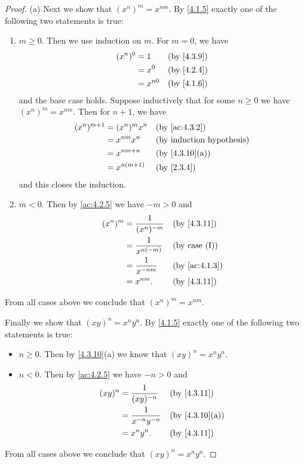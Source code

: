 \begin{proof}{(a)}
	Next we show that \((x^n)^m = x^{nm}\).
	By \cref{4.1.5} exactly one of the following two statements is true:
	\begin{enumerate}[label=(\Roman*)]
		\item \(m \geq 0\).
		      Then we use induction on \(m\).
		      For \(m = 0\), we have
		      \begin{align*}
			      (x^n)^0 & = 1      &  & \by{4.3.9} \\
			              & = x^0    &  & \by{4.2.4} \\
			              & = x^{n0} &  & \by{4.1.6}
		      \end{align*}
		      and the base case holds.
		      Suppose inductively that for some \(n \geq 0\) we have \((x^n)^m = x^{nm}\).
		      Then for \(n + 1\), we have
		      \begin{align*}
			      (x^n)^{m + 1} & = (x^n)^m x^n  &  & \by{ac:4.3.2}                \\
			                    & = x^{nm} x^n   &  & \byIH                        \\
			                    & = x^{nm + n}   &  & \text{(by \cref{4.3.10}(a))} \\
			                    & = x^{n(m + 1)} &  & \by{2.3.4}
		      \end{align*}
		      and this closes the induction.
		\item \(m < 0\).
		      Then by \cref{ac:4.2.5} we have \(-m > 0\) and
		      \begin{align*}
			      (x^n)^m & = \dfrac{1}{(x^n)^{-m}} &  & \by{4.3.11}          \\
			              & = \dfrac{1}{x^{n(-m)}}  &  & \text{(by case (I))} \\
			              & = \dfrac{1}{x^{-nm}}    &  & \by{ac:4.1.3}        \\
			              & = x^{nm}.               &  & \by{4.3.11}
		      \end{align*}
	\end{enumerate}
	From all cases above we conclude that \((x^n)^m = x^{nm}\).

	Finally we show that \((xy)^n = x^n y^n\).
	By \cref{4.1.5} exactly one of the following two statements is true:
	\begin{itemize}
		\item \(n \geq 0\).
		      Then by \cref{4.3.10}(a) we know that \((xy)^n = x^n y^n\).
		\item \(n < 0\).
		      Then by \cref{ac:4.2.5} we have \(-n > 0\) and
		      \begin{align*}
			      (xy)^n & = \dfrac{1}{(xy)^{-n}}     &  & \by{4.3.11}                  \\
			             & = \dfrac{1}{x^{-n} y^{-n}} &  & \text{(by \cref{4.3.10}(a))} \\
			             & = x^n y^n.                 &  & \by{4.3.11}
		      \end{align*}
	\end{itemize}
	From all cases above we conclude that \((xy)^n = x^n y^n\).
\end{proof}

